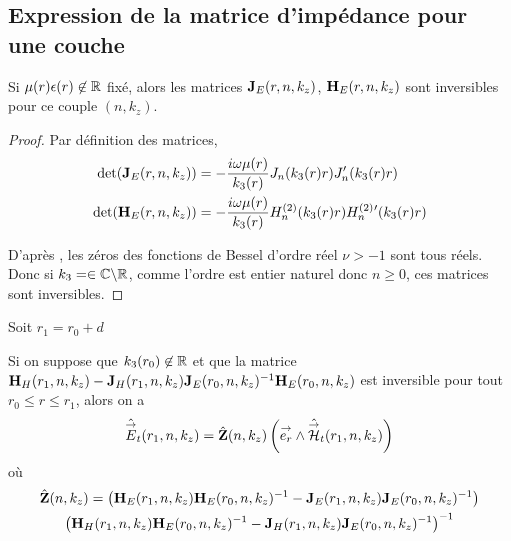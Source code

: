

  \subsection{Expression de la matrice d'impédance pour une couche}

    \begin{lemme}
      \label{lem:cylindre:imp:inv_matrices_JE-HE}
      Si \(\mu(r)\epsilon(r)\not \in \mathbb R\) fixé, alors les matrices \(\mathbf{J}_E(r,n,k_z)\), \(\mathbf{H}_E(r,n,k_z)\) sont inversibles pour ce couple \((n,k_z)\).
    \end{lemme}
    \begin{proof}
      Par définition des matrices,
      \begin{align}
        \det(\mathbf{J}_E(r,n,k_z)) &= -\dfrac{i\omega\mu(r)}{k_3(r)}J_n(k_3(r)r)J_n'(k_3(r)r)
        \\
        \det(\mathbf{H}_E(r,n,k_z)) &= -\dfrac{i\omega\mu(r)}{k_3(r)}H_n^{(2)}(k_3(r)r)H_n^{(2)}{}'(k_3(r)r)
      \end{align}

      D’après \cite[p.~370]{abramowitz_handbook_1964}, les zéros des fonctions de Bessel d'ordre réel \(\nu >-1\) sont tous réels.
      Donc si \(k_3 = \in\mathbb C\backslash\mathbb R\), comme l'ordre est entier naturel donc \(n\ge 0\), ces matrices sont inversibles.
    \end{proof}
    Soit \(r_1 = r_0 + d\)

    \begin{prop}
      Si on suppose que \(k_3(r_0) \not \in \mathbb R\) et que la matrice \(\mathbf{H}_{H}(r_1,n,k_z) - \mathbf{J}_{H}(r_1,n,k_z)\mathbf{J}_{E}(r_0,n,k_z)^{-1}\mathbf{H}_{E}(r_0,n,k_z)\) est inversible pour tout \(r_0 \le r \le r_1\), alors on a 
      \begin{equation*}
        \hat {{\overset{\rightarrow}{E}}}_t(r_1,n,k_z) = \hat {\mathbf{Z}}(n,k_z) \left({\overset{\rightarrow}{e_r}}\wedge \hat {{\overset{\rightarrow}{\mathcal{H}}}}_t(r_1,n,k_z)\right)
      \end{equation*}
      où
      \begin{multline*}
        \hat {\mathbf{Z}}(n,k_z) =
        \left(\mathbf{H}_{E}(r_1,n,k_z)\mathbf{H}_{E}(r_0,n,k_z)^{-1} - \mathbf{J}_{E}(r_1,n,k_z)\mathbf{J}_{E}(r_0,n,k_z)^{-1}\right)\\
        \left(\mathbf{H}_{H}(r_1,n,k_z)\mathbf{H}_{E}(r_0,n,k_z)^{-1} - \mathbf{J}_{H}(r_1,n,k_z)\mathbf{J}_{E}(r_0,n,k_z)^{-1}\right)^{-1}
      \end{multline*}
    \end{prop}

